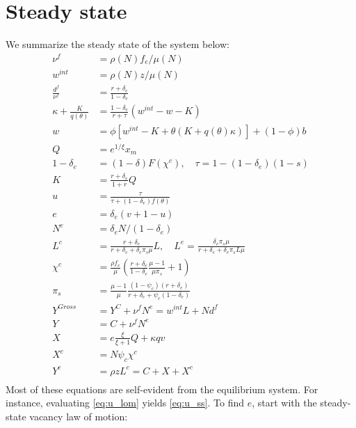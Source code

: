\documentclass[authoryear, review, 12pt]{elsarticle}
\begin{document}


	\section{Steady state}\label{app:steady_state}
	We summarize the steady state of the system below:
	\begin{align}
		\nu^f&=\rho(N)f_e/\mu(N)\\
		w^{int}&=\rho(N)z/\mu(N)\\
		\frac{d^f}{\nu^f}&=\frac{r+\delta_e}{1-\delta_e}\\
		\kappa+\frac{K}{q(\theta)}&=\frac{1-\delta_e}{r+\tau}(w^{int}-w-K)\\
		w &= \phi \left[ w^{int}-K+\theta(K+q(\theta)\kappa)\right]+(1-\phi)b\\
		Q&=e^{1/\xi}x_m \\
		1-\delta_e&=(1-\delta)F(\chi^c),\quad \tau=1-(1-\delta_e)(1-s)\\
		K&=\frac{r+\delta_e}{1+r}Q\\
		u&=\frac{\tau}{\tau+(1-\delta_e)f(\theta)}\label{eq:u_ss}\\
		e&=\delta_e(v+1-u)\label{eq:e_ss}\\
		N^e&=\delta_e N/(1-\delta_e)\\
		L^c&=\frac{r+\delta_e}{r+\delta_e+\delta_e \pi_s \mu}L,\quad L^e=\frac{\delta_e \pi_s \mu}{r+\delta_e+\delta_e\pi_s L \mu}\label{eq:labor_ss}\\
		\chi^c&=\frac{\rho f_e}{\mu}\left(\frac{r+\delta_e}{1-\delta_e}\frac{\mu-1}{\mu \pi_s}+1\right)\\
		\pi_s&=\frac{\mu-1}{\mu}\frac{(1-\psi_c)(r+\delta_e)}{r+\delta_e+\psi_c(1-\delta_e)}\\
		Y^{Gross}&=Y^C+\nu^f N^e=w^{int}L+Nd^f\\
		Y&=C+\nu^fN^e\\
		X&=e\frac{\xi}{\xi+1}Q+\kappa qv\\
		X^c&=N\psi_c \chi^c\\
		Y^c&=\rho zL^c=C+X+X^c\\
	\end{align}
	Most of these equations are self-evident from the equilibrium system. For instance, evaluating \eqref{eq:u_lom} yields \eqref{eq:u_ss}. To find $e$, start with the steady-state vacancy law of motion:
\end{document}
